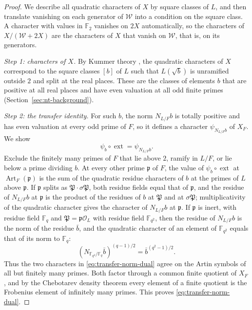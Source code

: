 \documentclass[11pt]{article}
\theoremstyle{plain}
\theoremstyle{definition}
\theoremstyle{remark}
\newcommand{\F}{\mathbb F}
\newcommand{\OO}{\mathcal O}
\begin{document}
\begin{proof}
We describe all quadratic characters of $X$ by square classes of $L$, and
then translate vanishing on each generator of $\mathcal W$ into a
condition on the square class.  A character with values in $\F_2$
vanishes on $2X$ automatically, so the characters of
$X/(\mathcal W+2X)$ are the characters of $X$ that vanish on
$\mathcal W$, that is, on its generators.

\emph{Step 1: characters of $X$.}  By Kummer theory
\cite[Chapter~VII, Appendix~A, Theorem~A.3]{MilneCFT}, the quadratic
characters of $X$ correspond to the square classes $[b]$ of $L$ such that
$L(\sqrt b)$ is unramified outside $2$ and split at the real places.
These are the classes of elements $b$ that are positive at all real
places and have even valuation at all odd finite primes
(Section~\ref{sec:nt-background}).

\emph{Step 2: the transfer identity.}  For such $b$, the norm $N_{L/F}b$ is
totally positive and has even valuation at every odd prime of $F$, so it
defines a character $\psi_{N_{L/F}b}$ of $X_F$.  We show
\begin{equation}\label{eq:transfer-norm-dual}
 \psi_b\circ\operatorname{ext}=\psi_{N_{L/F}b}.
\end{equation}
Exclude the finitely many primes of $F$ that lie above $2$, ramify in
$L/F$, or lie below a prime dividing $b$.  At every other prime
$\mathfrak p$ of $F$, the value of $\psi_b\circ\operatorname{ext}$ at
$\operatorname{Art}_F(\mathfrak p)$ is the sum of the quadratic residue
characters of $b$ at the primes of $L$ above $\mathfrak p$.  If
$\mathfrak p$ splits as $\mathfrak P\cdot\sigma\mathfrak P$, both residue
fields equal that of $\mathfrak p$, and the residue of $N_{L/F}b$ at
$\mathfrak p$ is the product of the residues of $b$ at $\mathfrak P$ and
at $\sigma\mathfrak P$; multiplicativity of the quadratic character gives
the character of $N_{L/F}b$ at $\mathfrak p$.  If $\mathfrak p$ is inert,
with residue field $\F_q$ and $\mathfrak P=\mathfrak p\OO_L$ with residue
field $\F_{q^2}$, then the residue of $N_{L/F}b$ is the norm of the
residue $\bar b$, and the quadratic character of an element of
$\F_{q^2}$ equals that of its norm to $\F_q$:
\[
 (N_{\F_{q^2}/\F_q}\bar b)^{(q-1)/2}
       =\bar b^{(q^2-1)/2}.
\]
Thus the two characters in \eqref{eq:transfer-norm-dual} agree on the
Artin symbols of all but finitely many primes.  Both factor through a
common finite quotient of $X_F$, and by the Chebotarev density theorem
\cite[Chapter~VIII, Theorem~7.4]{MilneCFT} every element of a finite
quotient is the Frobenius element of infinitely many primes.  This proves
\eqref{eq:transfer-norm-dual}.


\end{proof}
\end{document}
